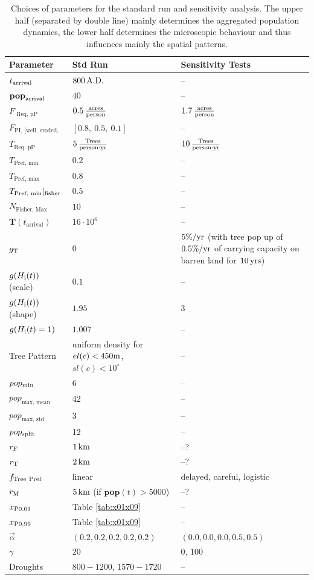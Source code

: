 \begin{table}
\begin{tabular}{l|K|H}
		Parameter &  Std Run & Sensitivity Tests \\ \hline
		$t_{\rm arrival}$ & $800\, {\rm A.D.}$ & --\\
		$\mathbf{pop}_{\rm arrival}$ & $40$ & --\\ \hline
		 $F_\text{ Req, pP}$ & $0.5\, {\rm \frac{acres}{person}}$ &  $1.7\, {\rm \frac{acres}{person}}$ \\
		 $F_\text{PI, [well, eroded, poor]}$ & $[0.8,\ 0.5,\ 0.1]$ & -- \\
		 $T_\text{Req, pP}$ & $5\, {\rm \frac{Trees}{person\cdot yr}}$ & $10\, {\rm \frac{Trees}{person\cdot yr}}$  \\
		  $T_\text{Pref, min}$ & $0.2$ & -- \\
		  $T_\text{Pref, max}$ & $0.8$ & --\\
		  $T_\text{Pref, min}|_{\rm fisher}$ & $0.5$ & --\\
		  $N_\text{Fisher, Max}$ & $10$ & -- \\ \hline
		  $\mathbf{T}(t_\text{arrival})$ & $16\cdot10^6$ & -- \\
		  $g_{\rm T}$ & $0$ & $5\%/{\rm yr}$ (with tree pop up of $0.5\%/{\rm yr}$ of carrying capacity on barren land for $10\, {\rm yrs}$) \\
		  \hline
		  $g(H_{\rm i}(t))$ (scale) & $0.1$ & --\\
		  $g(H_{\rm i}(t))$ (shape) & $1.95$ & $3$ \\
		  $g(H_{\rm i}(t)=1)$ & $1.007$ & -- \\ \hline \hline
		   Tree Pattern & uniform density for $el(c)<450{\rm m}$, $sl(c)<10^\circ$ & -- \\ \hline
		  $pop_{\rm min}$ & 6 & --\\
		  $pop_\text{max, mean}$ & 42 & --\\
		  $pop_\text{max, std}$ & 3 & -- \\
		  $pop_{\rm split}$ & 12 & --\\ \hline
		  $r_{\rm F}$ & $1\, {\rm km}$ & --? \TODO\\
		  $r_{\rm T}$ & $2\, {\rm km}$ & --? \TODO \\ \hline 
		  $f_{\rm Tree\  Pref}$ & linear & delayed, careful, logistic\\ \hline 
		  $r_{\rm M}$ & $5\, {\rm km}$ (if $\mathbf{pop}(t)>5000$) & --? \TODO \\
		  $x_{\rm P0.01}$ & Table \ref{tab:x01x09} & -- \\
		  $x_{\rm P0.99}$ & Table \ref{tab:x01x09} & -- \\
		  $\vec{\alpha}$ & $(0.2,0.2,0.2,0.2,0.2)$ & $(0.0,0.0,0.0,0.5,0.5)$\\
		  $\gamma$ & $20$ & $0$, $100$ \TODO \\
		  Droughts & $800-1200$, $1570-1720$ & -- \\
	\end{tabular}
	\caption{Choices of parameters for the standard run and sensitivity analysis. The upper half (separated by double line) mainly determines the aggregated population dynamics, the lower half determines the microscopic behaviour and thus influences mainly the spatial patterns.}
	\label{tab:sensitivity}
\end{table}

